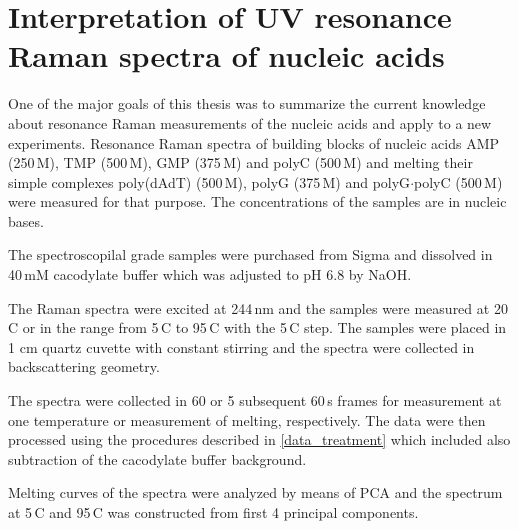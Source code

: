 \section{Interpretation of UV resonance Raman spectra of nucleic acids}
\label{interpretation}

\newlength{\assignwnl}
\settowidth{\assignwnl}{0000}
\newlength{\assignwnil}
\settowidth{\assignwnil}{(000)}
\newlength{\assignwnspl}
\setlength{\assignwnspl}{0.2cm}
\newlength{\assigntabrowindent}
\setlength{\assigntabrowindent}{.7em}


One of the major goals of this thesis was to summarize the current knowledge
about resonance Raman measurements of the nucleic acids and apply to a new
experiments.
Resonance Raman spectra of building blocks of nucleic acids AMP (250\,M),
TMP (500\,M), GMP (375\,M) and polyC (500\,M) and melting their
simple complexes poly(dAdT) (500\,M), polyG (375\,M) and
polyG$\cdot$polyC (500\,M) were measured for that purpose.
The concentrations of the samples are in nucleic bases.

The spectroscopilal grade samples were purchased from Sigma and dissolved in
40\,mM cacodylate buffer which was adjusted to pH 6.8 by NaOH.

The Raman spectra were excited at 244\,nm and the samples were measured at
20\,\textdegree{}C or in the range from 5\,\textdegree{}C to 95\,\textdegree{}C
with the 5\,\textdegree{}C step. The samples were placed in 1 cm quartz cuvette
with constant stirring and the spectra were collected in backscattering
geometry.

The spectra were collected in 60 or 5 subsequent 60\,s frames for measurement
at one temperature or measurement of melting, respectively.
The data were then processed using the procedures described in
\cref{data_treatment}
which included also subtraction of the cacodylate buffer background.

Melting curves of the spectra were analyzed by means of PCA and the spectrum
at 5\,\textdegree{}C and 95\,\textdegree{}C was constructed from first 4
principal components.

